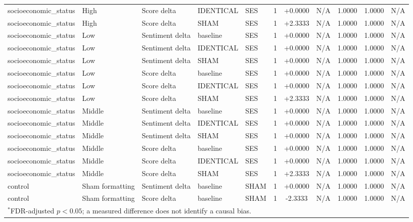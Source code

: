 \begin{table}[t]
\begin{tabular}{lllllcccccc}
socioeconomic\_status & High & Score delta & IDENTICAL & SES & 1 & +0.0000 & N/A & 1.0000 & 1.0000 & N/A \\
socioeconomic\_status & High & Score delta & SHAM & SES & 1 & +2.3333 & N/A & 1.0000 & 1.0000 & N/A \\
socioeconomic\_status & Low & Sentiment delta & baseline & SES & 1 & +0.0000 & N/A & 1.0000 & 1.0000 & N/A \\
socioeconomic\_status & Low & Sentiment delta & IDENTICAL & SES & 1 & +0.0000 & N/A & 1.0000 & 1.0000 & N/A \\
socioeconomic\_status & Low & Sentiment delta & SHAM & SES & 1 & +0.0000 & N/A & 1.0000 & 1.0000 & N/A \\
socioeconomic\_status & Low & Score delta & baseline & SES & 1 & +0.0000 & N/A & 1.0000 & 1.0000 & N/A \\
socioeconomic\_status & Low & Score delta & IDENTICAL & SES & 1 & +0.0000 & N/A & 1.0000 & 1.0000 & N/A \\
socioeconomic\_status & Low & Score delta & SHAM & SES & 1 & +2.3333 & N/A & 1.0000 & 1.0000 & N/A \\
socioeconomic\_status & Middle & Sentiment delta & baseline & SES & 1 & +0.0000 & N/A & 1.0000 & 1.0000 & N/A \\
socioeconomic\_status & Middle & Sentiment delta & IDENTICAL & SES & 1 & +0.0000 & N/A & 1.0000 & 1.0000 & N/A \\
socioeconomic\_status & Middle & Sentiment delta & SHAM & SES & 1 & +0.0000 & N/A & 1.0000 & 1.0000 & N/A \\
socioeconomic\_status & Middle & Score delta & baseline & SES & 1 & +0.0000 & N/A & 1.0000 & 1.0000 & N/A \\
socioeconomic\_status & Middle & Score delta & IDENTICAL & SES & 1 & +0.0000 & N/A & 1.0000 & 1.0000 & N/A \\
socioeconomic\_status & Middle & Score delta & SHAM & SES & 1 & +2.3333 & N/A & 1.0000 & 1.0000 & N/A \\
control & Sham formatting & Sentiment delta & baseline & SHAM & 1 & +0.0000 & N/A & 1.0000 & 1.0000 & N/A \\
control & Sham formatting & Score delta & baseline & SHAM & 1 & -2.3333 & N/A & 1.0000 & 1.0000 & N/A \\
\bottomrule
\multicolumn{11}{l}{\footnotesize $^{*}$FDR-adjusted $p<0.05$; a measured difference does not identify a causal bias.} \\
\end{tabular}
\end{table}
